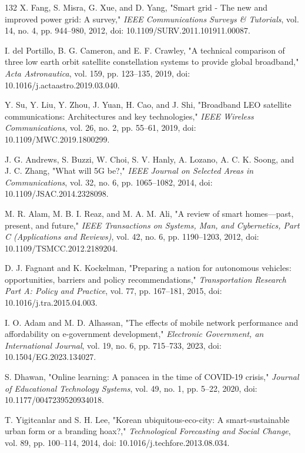 \documentclass[pdflatex,sn-mathphys-num]{sn-jnl}%
\theoremstyle{thmstyleone}%
\theoremstyle{thmstyletwo}%
\theoremstyle{thmstylethree}%
\begin{document}
\begin{thebibliography}{132}
 X. Fang, S. Misra, G. Xue, and D. Yang, "Smart grid - The new and improved power grid: A survey," \emph{IEEE Communications Surveys \& Tutorials}, vol. 14, no. 4, pp. 944--980, 2012, doi: 10.1109/SURV.2011.101911.00087.

 I. del Portillo, B. G. Cameron, and E. F. Crawley, "A technical comparison of three low earth orbit satellite constellation systems to provide global broadband," \emph{Acta Astronautica}, vol. 159, pp. 123--135, 2019, doi: 10.1016/j.actaastro.2019.03.040.

 Y. Su, Y. Liu, Y. Zhou, J. Yuan, H. Cao, and J. Shi, "Broadband LEO satellite communications: Architectures and key technologies," \emph{IEEE Wireless Communications}, vol. 26, no. 2, pp. 55--61, 2019, doi: 10.1109/MWC.2019.1800299.

 J. G. Andrews, S. Buzzi, W. Choi, S. V. Hanly, A. Lozano, A. C. K. Soong, and J. C. Zhang, "What will 5G be?," \emph{IEEE Journal on Selected Areas in Communications}, vol. 32, no. 6, pp. 1065--1082, 2014, doi: 10.1109/JSAC.2014.2328098.

 M. R. Alam, M. B. I. Reaz, and M. A. M. Ali, "A review of smart homes---past, present, and future," \emph{IEEE Transactions on Systems, Man, and Cybernetics, Part C (Applications and Reviews)}, vol. 42, no. 6, pp. 1190--1203, 2012, doi: 10.1109/TSMCC.2012.2189204.

 D. J. Fagnant and K. Kockelman, "Preparing a nation for autonomous vehicles: opportunities, barriers and policy recommendations," \emph{Transportation Research Part A: Policy and Practice}, vol. 77, pp. 167--181, 2015, doi: 10.1016/j.tra.2015.04.003.

 I. O. Adam and M. D. Alhassan, "The effects of mobile network performance and affordability on e-government development," \emph{Electronic Government, an International Journal}, vol. 19, no. 6, pp. 715--733, 2023, doi: 10.1504/EG.2023.134027.

 S. Dhawan, "Online learning: A panacea in the time of COVID-19 crisis," \emph{Journal of Educational Technology Systems}, vol. 49, no. 1, pp. 5--22, 2020, doi: 10.1177/0047239520934018.

 T. Yigitcanlar and S. H. Lee, "Korean ubiquitous-eco-city: A smart-sustainable urban form or a branding hoax?," \emph{Technological Forecasting and Social Change}, vol. 89, pp. 100--114, 2014, doi: 10.1016/j.techfore.2013.08.034.


\end{thebibliography}
\end{document}

